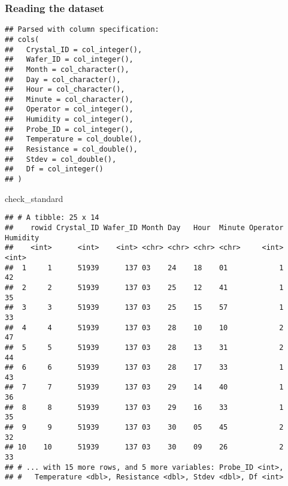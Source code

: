 \documentclass[]{book}
\newenvironment{Shaded}{\begin{snugshade}}{\end{snugshade}}
\newcommand{\DataTypeTok}[1]{\textcolor[rgb]{0.13,0.29,0.53}{#1}}
\newcommand{\KeywordTok}[1]{\textcolor[rgb]{0.13,0.29,0.53}{\textbf{#1}}}
\newcommand{\NormalTok}[1]{#1}
\newcommand{\OperatorTok}[1]{\textcolor[rgb]{0.81,0.36,0.00}{\textbf{#1}}}
\newcommand{\OtherTok}[1]{\textcolor[rgb]{0.56,0.35,0.01}{#1}}
\newcommand{\StringTok}[1]{\textcolor[rgb]{0.31,0.60,0.02}{#1}}
\theoremstyle{definition}
\theoremstyle{definition}
\theoremstyle{definition}
\theoremstyle{remark}
\begin{document}
\hypertarget{reading-the-dataset}{%
\subsubsection{Reading the dataset}\label{reading-the-dataset}}

\begin{Shaded}
\end{Shaded}

\begin{verbatim}
## Parsed with column specification:
## cols(
##   Crystal_ID = col_integer(),
##   Wafer_ID = col_integer(),
##   Month = col_character(),
##   Day = col_character(),
##   Hour = col_character(),
##   Minute = col_character(),
##   Operator = col_integer(),
##   Humidity = col_integer(),
##   Probe_ID = col_integer(),
##   Temperature = col_double(),
##   Resistance = col_double(),
##   Stdev = col_double(),
##   Df = col_integer()
## )
\end{verbatim}

\begin{Shaded}
\begin{Highlighting}[]
\NormalTok{check_standard}
\end{Highlighting}
\end{Shaded}

\begin{verbatim}
## # A tibble: 25 x 14
##    rowid Crystal_ID Wafer_ID Month Day   Hour  Minute Operator Humidity
##    <int>      <int>    <int> <chr> <chr> <chr> <chr>     <int>    <int>
##  1     1      51939      137 03    24    18    01            1       42
##  2     2      51939      137 03    25    12    41            1       35
##  3     3      51939      137 03    25    15    57            1       33
##  4     4      51939      137 03    28    10    10            2       47
##  5     5      51939      137 03    28    13    31            2       44
##  6     6      51939      137 03    28    17    33            1       43
##  7     7      51939      137 03    29    14    40            1       36
##  8     8      51939      137 03    29    16    33            1       35
##  9     9      51939      137 03    30    05    45            2       32
## 10    10      51939      137 03    30    09    26            2       33
## # ... with 15 more rows, and 5 more variables: Probe_ID <int>,
## #   Temperature <dbl>, Resistance <dbl>, Stdev <dbl>, Df <int>
\end{verbatim}
\end{document}
